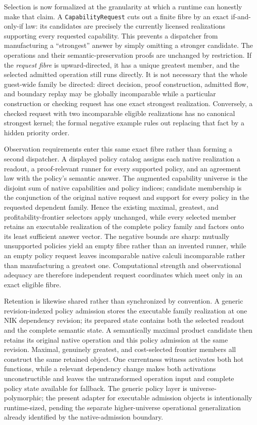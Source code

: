 \documentclass[11pt]{article}
\newcommand{\code}[1]{\texttt{#1}}
\begin{document}
Selection is now formalized at the granularity at which a runtime can honestly
make that claim.  A \code{CapabilityRequest} cuts out a finite fibre by an exact
if-and-only-if law: its candidates are precisely the currently licensed
realizations supporting every requested capability.  This prevents a dispatcher
from manufacturing a ``strongest'' answer by simply omitting a stronger
candidate.  The operations and their semantic-preservation proofs are unchanged
by restriction.  If the \emph{request fibre} is upward-directed, it has a unique
greatest member, and the selected admitted operation still runs directly.  It is
not necessary that the whole guest-wide family be directed: direct decision,
proof construction, admitted flow, and boundary replay may be globally
incomparable while a particular construction or checking request has one exact
strongest realization.  Conversely, a checked request with two incomparable
eligible realizations has no canonical strongest kernel; the formal negative
example rules out replacing that fact by a hidden priority order.

Observation requirements enter this same exact fibre rather than forming a
second dispatcher.  A displayed policy catalog assigns each native realization
a readout, a proof-relevant runner for every supported policy, and an agreement
law with the policy's semantic answer.  The augmented capability universe is
the disjoint sum of native capabilities and policy indices; candidate membership
is the conjunction of the original native request and support for every policy
in the requested dependent family.  Hence the existing maximal, greatest, and
profitability-frontier selectors apply unchanged, while every selected member
retains an executable realization of the complete policy family and factors
onto its least sufficient answer vector.  The negative bounds are sharp:
mutually unsupported policies yield an empty fibre rather than an invented
runner, while an empty policy request leaves incomparable native calculi
incomparable rather than manufacturing a greatest one.  Computational strength
and observational adequacy are therefore independent request coordinates which
meet only in an exact eligible fibre.

Retention is likewise shared rather than synchronized by convention.  A
generic revision-indexed policy admission stores the executable family realization
at one NIK dependency revision; its prepared state contains both the selected
readout and the complete semantic state.  A semantically maximal product
candidate then retains its original native operation and this policy admission
at the same revision.  Maximal, genuinely greatest, and cost-selected frontier
members all construct the same retained object.  One currentness witness
activates both hot functions, while a relevant dependency change makes both
activations unconstructible and leaves the untransformed operation input and
complete policy state available for fallback.  The generic policy layer is
universe-polymorphic; the present adapter for executable admission objects is
intentionally runtime-sized, pending the separate higher-universe operational
generalization already identified by the native-admission boundary.
\end{document}
